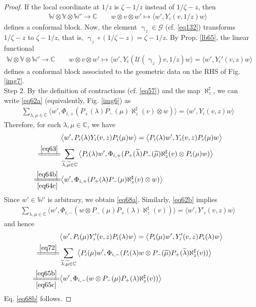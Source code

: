 \documentclass[11pt,b5paper,notitlepage]{article}
\theoremstyle{definition}
\theoremstyle{plain}
\newcommand{\wtd}{\widetilde}
\newcommand{\Vbb}{\mathbb V}
\newcommand{\Wbb}{\mathbb W}
\newcommand{\Cbb}{\mathbb C}
\newcommand{\<}{\left\langle}
\renewcommand{\>}{\right\rangle}
\newcommand{\MU}{\mathcal{U}}
\newcommand{\MG}{\mathcal G}
\newcommand{\bk}[1]{\langle {#1}\rangle}
\newcommand{\Lan}{{\big\langle}}
\newcommand{\Ran}{{\big\rangle}}
\numberwithin{equation}{section}
\begin{document}
\begin{proof}
If the local coordinate at $1/z$ is $\zeta-1/z$ instead of $1/\zeta-z$, then 
\begin{gather*}
\Wbb\otimes\Vbb\otimes\Wbb'\rightarrow\Cbb\qquad w\otimes v\otimes w'\mapsto\bk{w',Y_i(v,1/z)w}
\end{gather*}
defines a conformal block. Now, the element $\upgamma_z\in\MG$ (cf. \eqref{eq132}) transforms $1/\zeta-z$ to $\zeta-1/z$, that is, $\upgamma_z\circ(1/\zeta-z)=\zeta-1/z$. By Prop. \ref{lb65}, the linear functional
\begin{gather*}
\Wbb\otimes\Vbb\otimes\Wbb'\rightarrow\Cbb\qquad w\otimes v\otimes w'\mapsto\bk{w',Y_i(\MU(\upgamma_z)v,1/z)w}=\bk{w',Y_i'(v,z)w}
\end{gather*}
defines a conformal block associated to the geometric data on the RHS of Fig. \ref{img7}.\\[-1ex]


Step 2. By the definition of contractions (cf. \eqref{eq57}) and the map $\aleph_z^\sharp$, we can write \eqref{eq62a} (equivalently, Fig. \ref{img6}) as 
	\begin{align}\label{eq63}
\sum_{\lambda,\mu\in \Cbb}\Lan w',\Phi_{i,+}(P_+(\lambda)P_-(\mu)\aleph_z^\sharp(v)\otimes w)\Ran=\Lan w',Y_i(v,z)w \Ran
	\end{align}
Therefore, for each $\lambda,\mu\in\Cbb$, we have
	\begin{align*}
&\Lan w',P_i(\lambda)Y_i(v,z)P_i(\mu)w\Ran=\Lan P_i(\lambda)w',Y_i(v,z)P_i(\mu)w\Ran\\
\xlongequal{\eqref{eq63}}&\sum_{\wtd\lambda,\wtd \mu \in \Cbb}\Lan  P_i(\lambda)w',\Phi_{i,+}(P_+(\wtd \lambda)P_-(\wtd \mu)\aleph_z^\sharp(v)\otimes P_i(\mu)w)\Ran\\
\xlongequal[\eqref{eq64c}]{\eqref{eq64b}} &\Lan w',\Phi_{i,+}(P_+(\lambda)P_-(\mu)\aleph_z^\sharp(v)\otimes w)\Ran
	\end{align*}
Since $w'\in \Wbb'$ is arbitrary, we obtain \eqref{eq68a}. Similarly, \eqref{eq62b} implies
\begin{align}\label{eq72}
\sum_{\lambda,\mu\in \Cbb}\Lan w',\Phi_{i,-}(w\otimes P_-(\mu)P_+(\lambda)\aleph_z^\sharp(v))\Ran=\Lan w',Y'_i(v,z)w \Ran
\end{align}
and hence
\begin{align*}
&\Lan w',P_i(\mu)Y'_i(v,z)P_i(\lambda)w\Ran=\Lan P_i(\mu)w',Y'_i(v,z)P_i(\lambda)w\Ran\\
\xlongequal{\eqref{eq72}}&\sum_{\wtd\lambda,\wtd \mu \in \Cbb}\Lan  P_i(\mu)w',\Phi_{i,-}(P_i(\lambda)w\otimes P_-(\wtd \mu)P_+(\wtd \lambda)\aleph_z^\sharp(v))\Ran\\
\xlongequal[\eqref{eq65c}]{\eqref{eq65b}} &\Lan w',\Phi_{i,-}(w\otimes P_-(\mu)P_+(\lambda)\aleph_z^\sharp(v))\Ran
\end{align*}
Eq. \eqref{eq68b} follows.
\end{proof}
\end{document}

